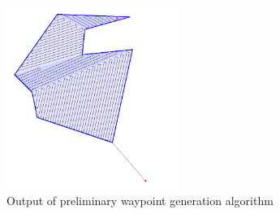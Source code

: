 \documentclass[main.tex]{subfiles}
\begin{document}
\begin{figure}[ht]
\includegraphics[width=0.5\textwidth]{5-DetailedDesign/lineScanAlgorithm.png}
\centering
\caption{Output of preliminary waypoint generation algorithm} 
\end{figure}
\end{document}
